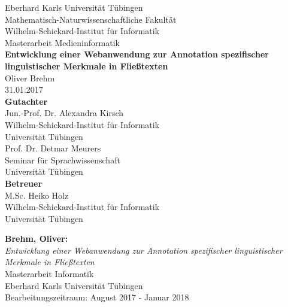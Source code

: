 \documentclass[twoside,12pt,a4paper]{scrreprt}
\begin{document}
\begin{titlepage}
\begin{center}
\LARGE Eberhard Karls Universität Tübingen\\
\large Mathematisch-Naturwissenschaftliche Fakultät \\
Wilhelm-Schickard-Institut für Informatik\\
[3cm]
\huge Masterarbeit Medieninformatik\\
[2cm]
\Large\textbf{Entwicklung einer Webanwendung zur Annotation spezifischer linguistischer Merkmale in Fließtexten}\\
[1.5cm]
\large Oliver Brehm\\
[0.5cm]
31.01.2017\\
\vfill
\small\textbf{Gutachter}\\[0.3cm]

\large Jun.-Prof. Dr. Alexandra Kirsch\\
\footnotesize Wilhelm-Schickard-Institut für Informatik\\Universität Tübingen\\
[0.5cm]

\large Prof. Dr. Detmar Meurers\\
\footnotesize Seminar für Sprachwissenschaft\\Universität Tübingen\\
[1cm]

\small\textbf{Betreuer}\\[0.3cm]
\large M.Sc. Heiko Holz\\
\footnotesize Wilhelm-Schickard-Institut für Informatik\\Universität Tübingen
\end{center}
\end{titlepage}

\thispagestyle{empty}
\vspace*{\fill}
\textbf{Brehm, Oliver:}\\
\emph{Entwicklung einer Webanwendung zur Annotation spezifischer linguistischer Merkmale in Fließtexten}\\
Masterarbeit Informatik\\
Eberhard Karls Universität Tübingen\\
Bearbeitungszeitraum: August 2017 - Januar 2018
\newpage


\newpage

\tableofcontents\label{toc}
\cleardoublepage
\end{document}
